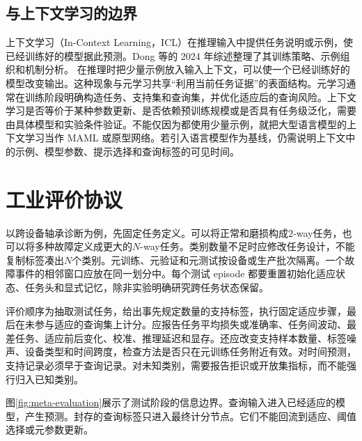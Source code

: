 \subsection{与上下文学习的边界}

上下文学习（In-Context Learning，ICL）在推理输入中提供任务说明或示例，使已经训练好的模型据此预测。Dong 等的 2024 年综述整理了其训练策略、示例组织和机制分析\cite{dong2024iclsurvey}。
在推理时把少量示例放入输入上下文，可以使一个已经训练好的模型改变输出。这种现象与元学习共享“利用当前任务证据”的表面结构。元学习通常在训练阶段明确构造任务、支持集和查询集，并优化适应后的查询风险。上下文学习是否等价于某种参数更新、是否依赖预训练规模或是否具有任务级泛化，需要由具体模型和实验条件验证。不能仅因为都使用少量示例，就把大型语言模型的上下文学习当作 MAML 或原型网络。若引入语言模型作为基线，仍需说明上下文中的示例、模型参数、提示选择和查询标签的可见时间。

\section{工业评价协议}

以跨设备轴承诊断为例，先固定任务定义。可以将正常和磨损构成$2$-way任务，也可以将多种故障定义成更大的$N$-way任务。类别数量不足时应修改任务设计，不能复制标签凑出$N$个类别。元训练、元验证和元测试按设备或生产批次隔离。一个故障事件的相邻窗口应放在同一划分中。每个测试 episode 都要重置初始化适应状态、任务头和显式记忆，除非实验明确研究跨任务状态保留。

评价顺序为抽取测试任务，给出事先规定数量的支持标签，执行固定适应步骤，最后在未参与适应的查询集上计分。应报告任务平均损失或准确率、任务间波动、最差任务、适应前后变化、校准、推理延迟和显存。还应改变支持样本数量、标签噪声、设备类型和时间跨度，检查方法是否只在元训练任务附近有效。对时间预测，支持记录必须早于查询记录。对未知类别，需要报告拒识或开放集指标，而不能强行归入已知类别。

图\ref{fig:meta-evaluation}展示了测试阶段的信息边界。查询输入进入已经适应的模型，产生预测。封存的查询标签只进入最终计分节点。它们不能回流到适应、阈值选择或元参数更新。

